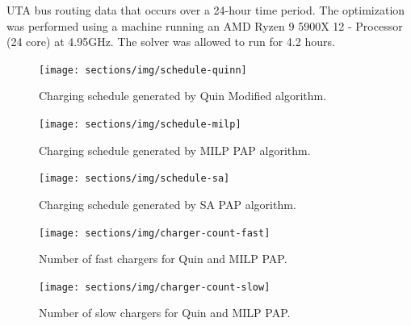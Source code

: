 \documentclass[11pt,a4paper,final]{article}
\newcommand{\timeran}{4.2 }                                                    %
\begin{document}
UTA bus routing data that occurs over a 24-hour time period. The optimization was performed using a machine running an
AMD Ryzen 9 5900X 12 - Processor (24 core) at 4.95GHz. The solver was allowed to run for \timeran hours.

\begin{subfigures}
    \begin{figure}[htpb]
    \centering \texttt{[image: sections/img/schedule-quinn]}
        \caption{Charging schedule generated by Quin Modified algorithm.}
        \label{subfig:schedule-quin}
    \end{figure}

    \hfill

   \begin{figure}[htpb]
   \centering \texttt{[image: sections/img/schedule-milp]}
       \caption{Charging schedule generated by MILP PAP algorithm.}
       \label{subfig:schedule-milp}
   \end{figure}

   \begin{figure}[htpb]
   \centering \texttt{[image: sections/img/schedule-sa]}
       \caption{Charging schedule generated by SA PAP algorithm.}
       \label{subfig:schedule-sa}
   \end{figure}
\end{subfigures}

\begin{subfigures}
    \begin{figure}[htpb]
    \centering
        \texttt{[image: sections/img/charger-count-fast]}
        \caption{Number of fast chargers for Quin and MILP PAP.}
        \label{subfig:fast-charger-usage}
    \end{figure}

    \hfill

    \begin{figure}[!ht]
    \centering
        \texttt{[image: sections/img/charger-count-slow]}
        \caption{Number of slow chargers for Quin and MILP PAP.}
        \label{subfig:slow-charger-usage}
    \end{figure}
\end{subfigures}
\end{document}
